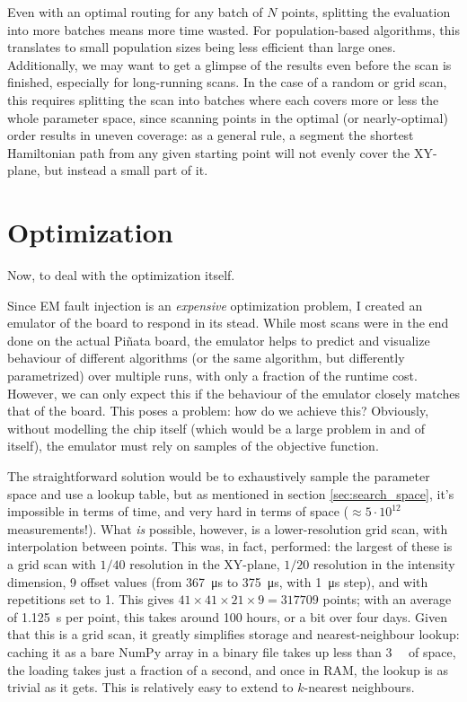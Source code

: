 \documentclass[times, utf8, diplomski]{fer}
\begin{document}
Even with an optimal routing for any batch of $N$ points, splitting the
evaluation into more batches means more time wasted. For population-based
algorithms, this translates to small population sizes being less efficient
than large ones. Additionally, we may want to get a glimpse of the results
even before the scan is finished, especially for long-running scans. In the
case of a random or grid scan, this requires splitting the scan into batches
where each covers more or less the whole parameter space, since scanning points
in the optimal (or nearly-optimal) order results in uneven coverage: as a
general rule, a segment the shortest Hamiltonian path from any given starting
point will not evenly cover the XY-plane, but instead a small part of it.





\chapter{Optimization}\label{ch:optimization}
Now, to deal with the optimization itself.

Since EM fault injection is an \emph{expensive} optimization problem, I created
an emulator of the board to respond in its stead. While most scans were in the
end done on the actual Piñata board, the emulator helps to predict and visualize
behaviour of different algorithms (or the same algorithm, but differently
parametrized) over multiple runs, with only a fraction of the runtime cost.
However, we can only expect this if the behaviour of the emulator closely
matches that of the board. This poses a problem: how do we achieve this?
Obviously, without modelling the chip itself (which would be a large problem
in and of itself), the emulator must rely on samples of the objective function.

The straightforward solution would be to exhaustively sample the parameter space
and use a lookup table, but as mentioned in section \ref{sec:search_space}, it's
impossible in terms of time, and very hard in terms of space ($\approx 5 \cdot
10^{12}$ measurements!). What \emph{is} possible, however, is a lower-resolution
grid scan, with interpolation between points. This was, in fact, performed: the
largest of these is a grid scan with $1/40$ resolution in the XY-plane, $1/20$
resolution in the intensity dimension, 9 offset values (from \SI{367}{\micro\second}
to \SI{375}{\micro\second}, with \SI{1}{\micro\second} step), and with repetitions
set to 1. This gives $41 \times 41 \times 21 \times 9 = 317709$ points; with an
average of \SI{1.125}{\second} per point, this takes around 100 hours, or a bit
over four days. Given that this is a grid scan, it greatly simplifies storage
and nearest-neighbour lookup: caching it as a bare NumPy array in a binary file
takes up less than \SI{3}{\mebi\byte} of space, the loading takes just a
fraction of a second, and once in RAM, the lookup is as trivial as it gets.
This is relatively easy to extend to $k$-nearest neighbours.
\end{document}
